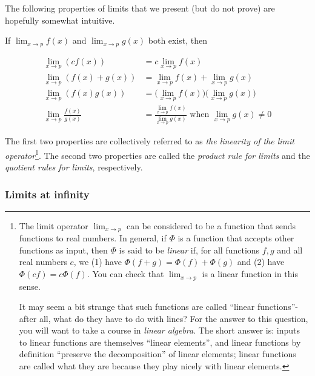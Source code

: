 The following properties of limits that we present (but do not prove) are hopefully somewhat intuitive.

\vspace{.25cm}

If $\lim_{x \rightarrow p} f(x)$ and $\lim_{x \rightarrow p} g(x)$ both exist, then

\begin{align*}
    \lim_{x \rightarrow p} (c f(x)) &= c \lim_{x \rightarrow p} f(x) \\
    \lim_{x \rightarrow p} (f(x) + g(x)) &= \lim_{x \rightarrow p} f(x) + \lim_{x \rightarrow p} g(x) \\
    \lim_{x \rightarrow p} (f(x) g(x)) &= \Big( \lim_{x \rightarrow p} f(x) \Big) \Big( \lim_{x \rightarrow p} g(x) \Big) \\
    \lim_{x \rightarrow p} \frac{f(x)}{g(x)} &= \frac{\lim_{x \rightarrow p} f(x)}{\lim_{x \rightarrow p} g(x)} \text{ when } \lim_{x \rightarrow p} g(x) \neq 0
\end{align*}

The first two properties are collectively referred to as \textit{the linearity of the limit operator}\footnote{The limit operator $\lim_{x \rightarrow p}$ can be considered to be a function that sends functions to real numbers. In general, if $\Phi$ is a function that accepts other functions as input, then $\Phi$ is said to be \textit{linear} if, for all functions $f, g$ and all real numbers $c$, we (1) have $\Phi(f + g) = \Phi(f) + \Phi(g)$ and (2) have $\Phi(cf) = c\Phi(f)$. You can check that $\lim_{x \rightarrow p}$ is a linear function in this sense.

It may seem a bit strange that such functions are called ``linear functions''- after all, what do they have to do with lines? For the answer to this question, you will want to take a course in \textit{linear algebra}. The short answer is: inputs to linear functions are themselves ``linear elements'', and linear functions by definition ``preserve the decomposition'' of linear elements; linear functions are called what they are because they play nicely with linear elements.}. The second two properties are called the \textit{product rule for limits} and the \textit{quotient rules for limits}, respectively.
    
\subsubsection*{Limits at infinity}

